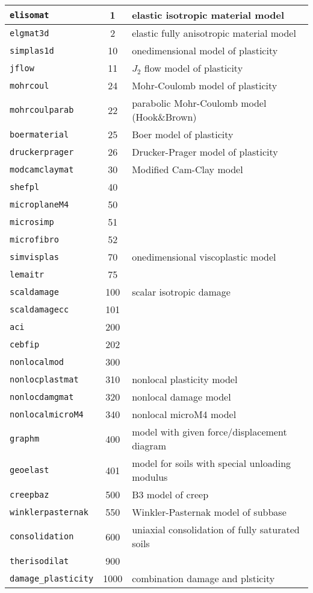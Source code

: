\begin{center}
\begin{tabular}{|l|c|l|}
\hline
{\tt elisomat} & 1 & elastic isotropic material model
\\ \hline
{\tt elgmat3d} & 2 & elastic fully anisotropic material model
\\ \hline
{\tt simplas1d} & 10 & onedimensional model of plasticity
\\ \hline
{\tt jflow} & 11 & $J_2$ flow model of plasticity
\\ \hline
{\tt mohrcoul} & 24 & Mohr-Coulomb model of plasticity
\\ \hline
{\tt mohrcoulparab} & 22 & parabolic Mohr-Coulomb model (Hook\&Brown)
\\ \hline
{\tt boermaterial} & 25 & Boer model of plasticity
\\ \hline
{\tt druckerprager} & 26 & Drucker-Prager model of plasticity
\\ \hline
{\tt modcamclaymat} & 30 & Modified Cam-Clay model
\\ \hline
{\tt shefpl} & 40 &
\\ \hline
{\tt microplaneM4} & 50 &
\\ \hline
{\tt microsimp} & 51 &
\\ \hline
{\tt microfibro} & 52 &
\\ \hline
{\tt simvisplas} & 70 & onedimensional viscoplastic model
\\ \hline
{\tt lemaitr} & 75 &
\\ \hline
{\tt scaldamage} & 100 & scalar isotropic damage
\\ \hline
{\tt scaldamagecc} & 101 &
\\ \hline
{\tt aci} & 200 &
\\ \hline
{\tt cebfip} & 202 &
\\ \hline
{\tt nonlocalmod} & 300 &
\\ \hline
{\tt nonlocplastmat} & 310 & nonlocal plasticity model
\\ \hline
{\tt nonlocdamgmat} & 320 & nonlocal damage model
\\ \hline
{\tt nonlocalmicroM4} & 340 & nonlocal microM4 model
\\ \hline
{\tt graphm} & 400 & model with given force/displacement diagram
\\ \hline
{\tt geoelast} & 401 & model for soils with special unloading modulus
\\ \hline
{\tt creepbaz} & 500 & B3 model of creep
\\ \hline
{\tt winklerpasternak} & 550 & Winkler-Pasternak model of subbase
\\ \hline
{\tt consolidation} & 600 & uniaxial consolidation of fully saturated soils
\\ \hline
{\tt therisodilat} & 900 &
\\ \hline
{\tt damage\_plasticity} & 1000 & combination damage and plsticity
\\ \hline
\end{tabular}
\end{center}

